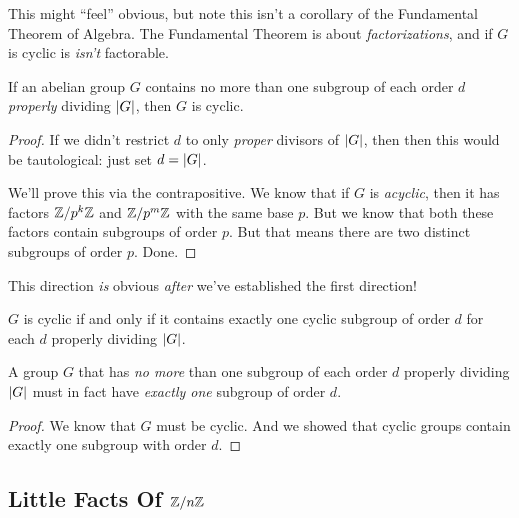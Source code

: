 \begin{remark}
  This might ``feel'' obvious, but note this isn't a corollary of the
  Fundamental Theorem of Algebra. The Fundamental Theorem is about
  \emph{factorizations}, and if $G$ is cyclic is \emph{isn't}
  factorable.
\end{remark}

\begin{proposition}
  If an abelian group $G$ contains no more than one subgroup of each
  order $d$ \emph{properly} dividing $|G|$, then $G$ is cyclic.
\end{proposition}

\begin{proof}
  If we didn't restrict $d$ to only \emph{proper} divisors of
  $|G|$, then then this would be tautological: just set $d =
  |G|$.

  We'll prove this via the contrapositive. We know that if $G$ is
  \emph{acyclic}, then it has factors $\mathbb{Z} / p^k\mathbb{Z}$ and $\mathbb{Z} / p^m\mathbb{Z}$ with
  the same base $p$. But we know that both these factors contain
  subgroups of order $p$. But that means there are two distinct
  subgroups of order $p$. Done.
\end{proof}

\begin{remark}
  This direction \emph{is} obvious \emph{after} we've established the
  first direction!
\end{remark}

\begin{theorem}
  $G$ is cyclic if and only if it contains exactly one cyclic subgroup
  of order $d$ for each $d$ properly dividing $|G|$.
\end{theorem}

\begin{corollary}
  A group $G$ that has \emph{no more} than one subgroup of each order
  $d$ properly dividing $|G|$ must in fact have \emph{exactly one}
  subgroup of order $d$.
\end{corollary}

\begin{proof}
  We know that $G$ must be cyclic. And we showed that cyclic groups
  contain exactly one subgroup with order $d$.
\end{proof}

\subsection{Little Facts Of $\mathbb{Z} / n\mathbb{Z}$}


